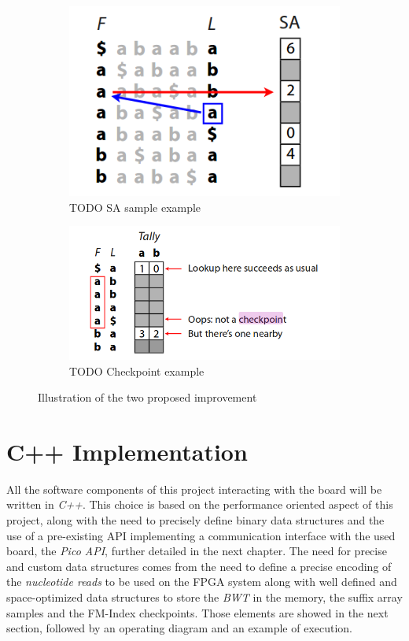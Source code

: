 		\begin{figure}[h]
			\centering
			\begin{subfigure}{.5\textwidth}
				\centering
				\includegraphics[width=.5\linewidth]{Figures/sa.png}
				\caption{TODO SA sample example}
				\label{fig:ssa}
				\end{subfigure}%
				\begin{subfigure}{.5\textwidth}
					\centering
					\includegraphics[width=.8\linewidth]{Figures/CHECKPOINT.png}
					\caption{TODO Checkpoint example}
					\label{fig:sub2}
					\end{subfigure}
					\caption{Illustration of the two proposed improvement}
					\label{fig:checkpoints}
					\end{figure}


\section{C++ Implementation}

All the software components of this project interacting with the board will be written in \textsl{C++}. This choice is based on the performance oriented aspect of this project, along with the need to precisely define binary data structures and the use of a pre-existing API implementing a communication interface with the used board, the \textit{Pico API}, further detailed in the next chapter. The need for precise and custom data structures comes from the need to define a precise encoding of the \textsl{nucleotide reads} to be used on the FPGA system along with well defined and space-optimized data structures to store the \textsl{BWT} in the memory, the suffix array samples and the FM-Index checkpoints. Those elements are showed in the next section, followed by an operating diagram and an example of execution.

